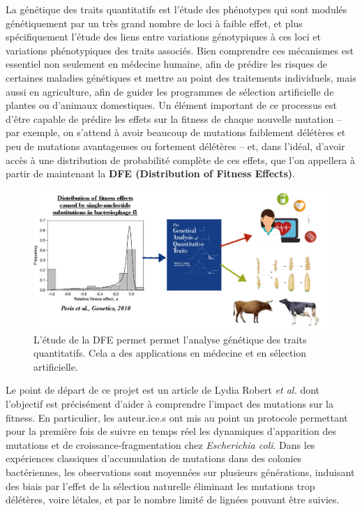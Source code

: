\documentclass[12pt]{article}
\begin{document}
La génétique des traits quantitatifs \cite{mac} est l'étude des phénotypes qui sont modulés génétiquement par un très grand nombre de loci à faible effet, et plus spécifiquement l'étude des liens entre variations génotypiques à ces loci et variations phénotypiques des traits associés. Bien comprendre ces mécanismes est essentiel non seulement en médecine humaine, afin de prédire les risques de certaines maladies génétiques et mettre au point des traitements individuels, mais aussi en agriculture, afin de guider les programmes de sélection artificielle de plantes ou d'animaux domestiques. Un élément important de ce processus est d'être capable de prédire les effets sur la fitness de chaque nouvelle mutation -- par exemple, on s'attend à avoir beaucoup de mutations faiblement délétères et peu de mutations avantageuses ou fortement délétères -- et, dans l'idéal, d'avoir accès à une distribution de probabilité complète de ces effets, que l'on appellera à partir de maintenant la \textbf{DFE (Distribution of Fitness Effects)}.

\begin{figure}[h]
 \begin{center}
	\vspace{3mm}
	\includegraphics[scale=0.25]{../Img/DFE_phage_2010.jpg}
\end{center} 
  \caption{L'étude de la DFE permet permet l'analyse génétique des traits quantitatifs. Cela a des applications en médecine et en sélection artificielle.}
\end{figure}

Le point de départ de ce projet est un article de Lydia Robert \textit{et al.} \cite{rob} dont l'objectif est précisément d'aider à comprendre l’impact des mutations sur la fitness. En particulier, les auteur.ice.s ont mis au point un protocole permettant pour la première fois de suivre en temps réel les dynamiques d’apparition des mutations et de croissance-fragmentation chez \textit{Escherichia coli}. Dans les expériences classiques d’accumulation de mutations dans des colonies bactériennes, les observations sont moyennées sur plusieurs générations, induisant des biais par l’effet de la sélection naturelle éliminant les mutations trop délétères, voire létales, et par le nombre limité de lignées pouvant être suivies. 
\end{document}
